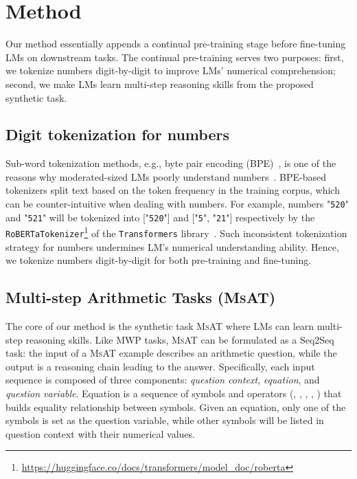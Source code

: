 \documentclass[11pt]{article}
\begin{document}
\section{Method}

  Our method essentially appends a continual pre-training stage before fine-tuning LMs on downstream tasks.
The continual pre-training serves two purposes:
first, we tokenize numbers digit-by-digit to improve LMs' numerical comprehension;
second, we make LMs learn multi-step reasoning skills from the proposed synthetic task.

    

    \subsection{Digit tokenization for numbers}
Sub-word tokenization methods, e.g.,  byte pair encoding (BPE)~\cite{sennrich2016bpe}, 
        is one of the reasons why moderated-sized LMs poorly understand numbers~\cite{wallace2019nlp}.
BPE-based tokenizers split text based on the token frequency in the training corpus, which can be counter-intuitive when dealing with numbers.
For example, numbers "\texttt{\small 520}" and "\texttt{\small 521}" will be tokenized into 
        ["\texttt{\small520}"] and ["\texttt{\small5}", "\texttt{\small21}"] respectively by the \texttt{RoBERTaTokenizer}\footnote{\url{https://huggingface.co/docs/transformers/model_doc/roberta}} of the \texttt{Transformers} library~\cite{wolf2020hf}.
Such inconsistent tokenization strategy for numbers undermines LM's numerical understanding ability.
Hence, we tokenize numbers digit-by-digit for both pre-training and fine-tuning.
    

    
    \subsection{Multi-step Arithmetic Tasks (\textsc{MsAT})}
      

      The core of our method is the synthetic task \textsc{MsAT} where LMs can learn multi-step reasoning skills.
Like MWP tasks, \textsc{MsAT} can be formulated as a Seq2Seq task:
        the input of a \textsc{MsAT} example describes an arithmetic question,
        while the output is a reasoning chain leading to the answer.
Specifically, each input sequence is composed of three components: {\em question context}, {\em equation}, and {\em question variable}.
Equation is a sequence of symbols and operators (, , , , ) that builds equality relationship between symbols.
Given an equation, only one of the symbols is set as the question variable,
while other symbols will be listed in question context with their numerical values.
      
\end{document}
